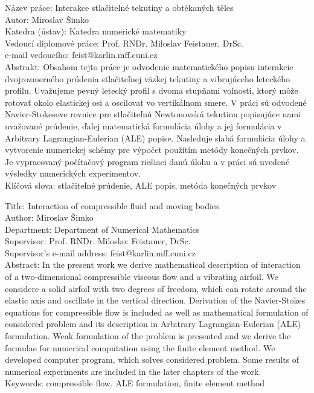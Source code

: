 \newpage

\noindent
Název práce: Interakce stlačitelné tekutiny a obtékaných těles\\
Autor: Miroslav Šimko\\
Katedra (ústav): Katedra numerické matematiky\\
Vedoucí diplomové práce: Prof. RNDr. Miloslav Feistauer, DrSc.\\
e-mail vedoucího: feist@karlin.mff.cuni.cz\\

\noindent Abstrakt: Obsahom tejto práce je odvodenie matematického popisu
interakcie dvojrozmerného prúdenia stlačiteľnej väzkej tekutiny a vibrujúceho
leteckého profilu. Uvažujeme pevný letecký profil s dvoma stupňami voľnosti,
ktorý môže rotovať okolo elastickej osi a oscilovať vo vertikálnom smere. V
práci sú odvodené Navier-Stokesove rovnice pre stlačiteľnú Newtonovskú tekutinu
popisujúce nami uvažované prúdenie, ďalej matematická formulácia úlohy a jej
formulácia v Arbitrary Lagrangian-Eulerian (ALE) popise. Nasleduje slabá formulácia
úlohy a vytvorenie numerickej schémy pre výpočet použítím metódy konečných
prvkov. Je vypracovaný počítačový program riešiaci danú úlohu a v práci sú
uvedené výsledky numerických experimentov. \\

\noindent Klíčová slova: stlačiteľné prúdenie, ALE popis, metóda konečných prvkov

\vspace{5mm}

\noindent
Title: Interaction of compressible fluid and moving bodies\\
Author: Miroslav Šimko\\
Department: Department of Numerical Mathematics\\
Supervisor: Prof. RNDr. Miloslav Feistauer, DrSc.\\
Supervisor's e-mail address: feist@karlin.mff.cuni.cz\\

\noindent Abstract: In the present work we derive mathematical description of
interaction of a two-dimensional compressible viscous flow and a vibrating
airfoil. We considere a solid airfoil with two degrees of freedom, which can
rotate around the elastic axis and oscillate in the vertical direction.
Derivation of the Navier-Stokes equations for compressible flow is included as
well as mathematical formulation of considered problem and its description in
Arbitrary Lagrangian-Eulerian (ALE) formulation. Weak formulation of the problem
is presented and we derive the formulae for numerical computation using the
finite element method. We developed computer program, which solves considered
problem. Some results of numerical experiments are included in the later
chapters of the work. \\

\noindent Keywords: compressible flow, ALE formulation, finite element method

\newpage

